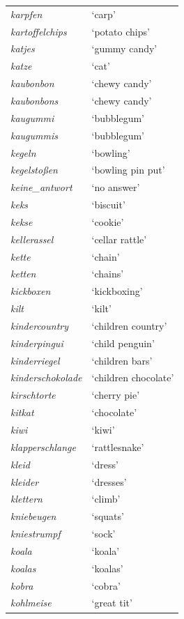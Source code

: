 \begin{longtable}{ll}
\textit{karpfen} & `carp' \\
\textit{kartoffelchips} & `potato chips' \\
\textit{katjes} & `gummy candy' \\
\textit{katze} & `cat' \\
\textit{kaubonbon} & `chewy candy' \\
\textit{kaubonbons} & `chewy candy' \\
\textit{kaugummi} & `bubblegum' \\
\textit{kaugummis} & `bubblegum' \\
\textit{kegeln} & `bowling' \\
\textit{kegelstoßen} & `bowling pin put' \\
\textit{keine\_antwort} & `no answer' \\
\textit{keks} & `biscuit' \\
\textit{kekse} & `cookie' \\
\textit{kellerassel} & `cellar rattle' \\
\textit{kette} & `chain' \\
\textit{ketten} & `chains' \\
\textit{kickboxen} & `kickboxing' \\
\textit{kilt} & `kilt' \\
\textit{kindercountry} & `children country' \\
\textit{kinderpingui} & `child penguin' \\
\textit{kinderriegel} & `children bars' \\
\textit{kinderschokolade} & `children chocolate' \\
\textit{kirschtorte} & `cherry pie' \\
\textit{kitkat} & `chocolate' \\
\textit{kiwi} & `kiwi' \\
\textit{klapperschlange} & `rattlesnake' \\
\textit{kleid} & `dress' \\
\textit{kleider} & `dresses' \\
\textit{klettern} & `climb' \\
\textit{kniebeugen} & `squats' \\
\textit{kniestrumpf} & `sock' \\
\textit{koala} & `koala' \\
\textit{koalas} & `koalas' \\
\textit{kobra} & `cobra' \\
\textit{kohlmeise} & `great tit' \\

\end{longtable}
